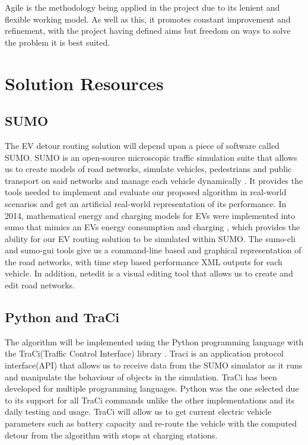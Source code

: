 \documentclass[11pt]{report}
\begin{document}
Agile is the methodology being applied in the project due to its lenient and flexible working model. As well as this, it promotes constant improvement and refinement, with the project having defined aims but freedom on ways to solve the problem it is best suited.

\section{Solution Resources}

\subsection{SUMO}

The EV detour routing solution will depend upon a piece of software called SUMO. SUMO is an open-source microscopic traffic simulation suite that allows us to create models of road networks, simulate vehicles, pedestrians and public transport on said networks and manage each vehicle dynamically \autocite{SUMO2018}. It provides the tools needed to implement and evaluate our proposed algorithm in real-world scenarios and get an artificial real-world representation of its performance. In 2014, mathematical energy and charging models for EVs were implemented into sumo that mimics an EVs energy consumption and charging \autocite{kurczveil2013implementation}, which provides the ability for our EV routing solution to be simulated within SUMO. The sumo-cli and sumo-gui tools give us a command-line based and graphical representation of the road networks, with time step based performance XML outputs for each vehicle. In addition, netedit is a visual editing tool that allows us to create and edit road networks.

\subsection{Python and TraCi}

The algorithm will be implemented using the Python programming language with the TraCi(Traffic Control Interface) library \autocite{van1991python} \autocite{traciPython}. Traci is an application protocol interface(API) that allows us to receive data from the SUMO simulator as it runs and manipulate the behaviour of objects in the simulation. TraCi has been developed for multiple programming languages. Python was the one selected due to its support for all TraCi commands unlike the other implementations and its daily testing and usage. TraCi will allow us to get current electric vehicle parameters such as battery capacity and re-route the vehicle with the computed detour from the algorithm with stops at charging stations.
\end{document}
